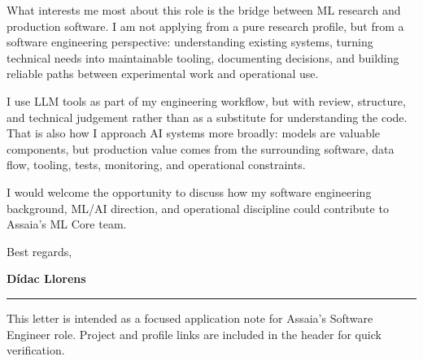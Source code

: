 \documentclass[a4paper,10pt]{article}
\begin{document}
What interests me most about this role is the bridge between ML research and production software. I am not applying from a pure research profile, but from a software engineering perspective: understanding existing systems, turning technical needs into maintainable tooling, documenting decisions, and building reliable paths between experimental work and operational use.

I use LLM tools as part of my engineering workflow, but with review, structure, and technical judgement rather than as a substitute for understanding the code. That is also how I approach AI systems more broadly: models are valuable components, but production value comes from the surrounding software, data flow, tooling, tests, monitoring, and operational constraints.

I would welcome the opportunity to discuss how my software engineering background, ML/AI direction, and operational discipline could contribute to Assaia's ML Core team.

\vspace{0.8em}
Best regards,\par
\vspace{0.35em}
{\bfseries Dídac Llorens}

\vfill
{\color{line}\hrule}
\vspace{0.45em}
{\scriptsize\color{muted}\ttfamily This letter is intended as a focused application note for Assaia's Software Engineer role. Project and profile links are included in the header for quick verification.}
\end{document}
